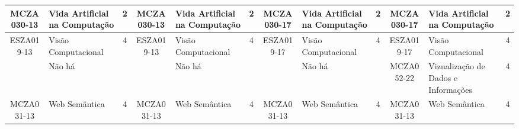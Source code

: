 \documentclass[a4paper]{article}
\begin{document}
\begin{landscape}
{\begin{longtable}{|c|p{.2\textheight}|c||c|p{.2\textheight}|c||c|p{.2\textheight}|c||c|p{.2\textheight}|c|}
MCZA030-13 & Vida Artificial na Computação & 2 &
MCZA030-13 & Vida Artificial na Computação & 2 &
MCZA030-17 & Vida Artificial na Computação & 2 &
MCZA030-17 & Vida Artificial na Computação & 2\\ \hline

ESZA019-13 & Visão Computacional & 4 &
ESZA019-13 & Visão Computacional & 4 &
ESZA019-17 & Visão Computacional & 4 &
ESZA019-17 & Visão Computacional & 4\\ \hline

& Não há & &
& Não há & & 
& Não há & & 
MCZA052-22 & Vizualização de Dados e Informações & 4\\ \hline

MCZA031-13 & Web Semântica & 4 &
MCZA031-13 & Web Semântica & 4 &
MCZA031-13 & Web Semântica & 4 &
MCZA031-13 & Web Semântica & 4\\ \hline
    
\end{longtable}
}
\end{landscape}
\end{document}
